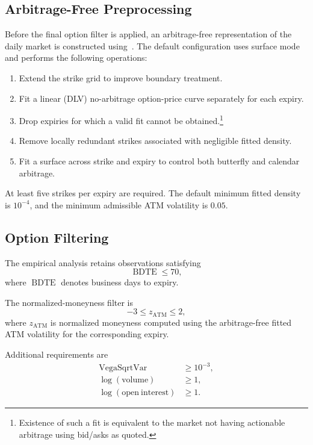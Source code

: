 \documentclass[11pt,a4paper]{article}
\begin{document}
\subsection{Arbitrage-Free Preprocessing}

Before the final option filter is applied, an arbitrage-free representation of the daily market is constructed using~\citet{SANOS2026}. The default configuration uses surface mode and performs the following operations:
%
\begin{enumerate}
    \item Extend the strike grid to improve boundary treatment.
    \item Fit a linear (DLV) no-arbitrage option-price curve separately for each expiry.
    \item Drop expiries for which a valid fit cannot be obtained.\footnote{
        Existence of such a fit is equivalent to the market not having actionable arbitrage
        using bid/asks as quoted.    
    }
    \item Remove locally redundant strikes associated with negligible fitted density.
    \item Fit a surface across strike and expiry to control both butterfly and calendar arbitrage.
\end{enumerate}

At least five strikes per expiry are required. The default minimum fitted density is \(10^{-4}\), and the minimum admissible ATM volatility is \(0.05\).

\subsection{Option Filtering}

The empirical analysis retains observations satisfying
%
\[
    \operatorname{BDTE} \leq 70,
\]
%
where \(\operatorname{BDTE}\) denotes business days to expiry.

The normalized-moneyness filter is
%
\[
    -3 \leq z_{\mathrm{ATM}} \leq 2,
\]
%
where \(z_{\mathrm{ATM}}\) is normalized moneyness computed using the
arbitrage-free fitted ATM volatility for the corresponding expiry.

Additional requirements are
%
\[
\begin{aligned}
    \mathrm{VegaSqrtVar} &\geq 10^{-3}, \\
    \log(\mathrm{volume}) &\geq 1, \\
    \log(\mathrm{open\ interest}) &\geq 1.
\end{aligned}
\]
\end{document}
